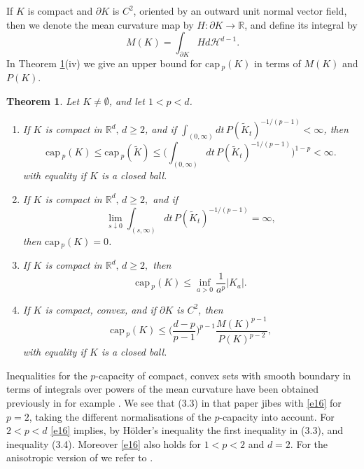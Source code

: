 \documentclass[a4paper,9pt]{article}
\newcommand{\R}{\mathbb{R}}
\newtheorem{theorem}{Theorem}
\def\cp{\mathrm{cap}\,}
\begin{document}
If $K$ is compact and $\partial K$ is $C^2$, oriented by an outward unit normal vector field, then we denote the mean curvature map by $H:\partial K\rightarrow \R$, and define its integral by
\begin{equation*}%
M(K)=\int_{\partial K}Hd\mathcal{H}^{d-1}.
\end{equation*}
In Theorem \ref{the1}(iv) we give an upper bound for $\cp_p(K)$ in terms of $M(K)$ and $P(K)$.


\begin{theorem}\label{the1} Let $K\ne \emptyset$, and let $1<p<d$.
\begin{enumerate}
\item[\textup{(i)}] If  $K$ is compact in $\R^d,\,d\ge 2$, and if $\int_{(0,\infty)}dt\, P(\tilde{K}_t)^{-1/(p-1)}<\infty$, then
\begin{equation*}%
\cp_p(K)\le \cp_p(\tilde{K})\le \Big(\int_{(0,\infty)}dt\, P(\tilde{K}_{t})^{-1/(p-1)}\Big)^{1-p}<\infty.
\end{equation*}
with equality if $K$ is a closed ball.
\item[\textup{(ii)}]If $K$ is compact in $\R^d,\,d\ge 2,$ and if
\begin{equation*}%
\lim_{s\downarrow 0}\int_{(s,\infty)}dt\, P(\tilde{K}_t)^{-1/(p-1)}=\infty,
\end{equation*}
then $\cp_p(K)=0$.
\item[\textup{(iii)}]If $K$ is compact in $\R^d,\,d\ge 2,$ then
\begin{equation}\label{e15}
\cp_p(K)\le \inf_{a>0}\frac{1}{a^p}|K_a|.
\end{equation}
\item[\textup{(iv)}] If $K$ is compact, convex, and if $\partial K$ is $C^2$, then
\begin{equation}\label{e16}
\cp_p(K)\le \Big(\frac{d-p}{p-1}\Big)^{p-1}\frac{M(K)^{p-1}}{P(K)^{p-2}},
\end{equation}
with equality if $K$ is a closed ball.
\end{enumerate}
\end{theorem}

Inequalities for the $p$-capacity of compact, convex sets with smooth boundary in terms of integrals over powers of the mean curvature have been obtained previously in for example \cite[Theorem 3.1]{xiao}. We see that (3.3) in that paper jibes with \eqref{e16} for $p=2$, taking the different normalisations of the $p$-capacity into account. For $2<p<d$ \eqref{e16} implies, by H\"older's inequality the first inequality in (3.3), and inequality (3.4). Moreover \eqref{e16} also holds for $1<p<2$ and $d=2$. For the anisotropic version of \cite[Theorem 3.1]{xiao} we refer to \cite[Theorem 3]{li}.
\end{document}
